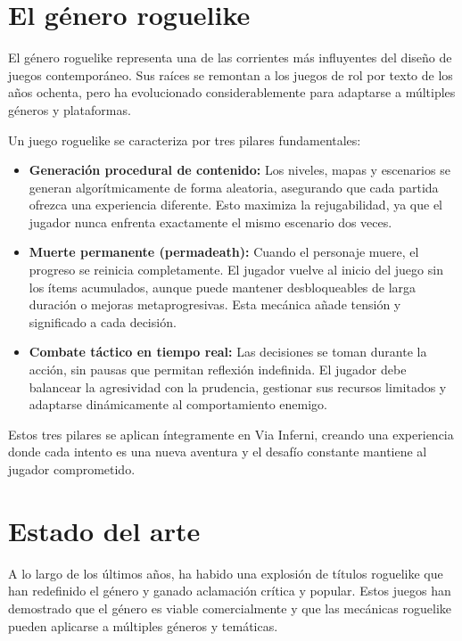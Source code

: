 \section{El género roguelike}

El género roguelike representa una de las corrientes más influyentes
del diseño de juegos contemporáneo.
Sus raíces se remontan a los juegos de rol por texto de los años ochenta,
pero ha evolucionado considerablemente para adaptarse a múltiples géneros y plataformas.

Un juego roguelike se caracteriza por tres pilares fundamentales:

\begin{itemize}
    \item \textbf{Generación procedural de contenido:} Los niveles, mapas y escenarios
se generan algorítmicamente de forma aleatoria,
asegurando que cada partida ofrezca una experiencia diferente.
Esto maximiza la rejugabilidad,
ya que el jugador nunca enfrenta exactamente el mismo escenario dos veces.
    
    \item \textbf{Muerte permanente (permadeath):} Cuando el personaje muere,
el progreso se reinicia completamente.
El jugador vuelve al inicio del juego sin los ítems acumulados,
aunque puede mantener desbloqueables de larga duración o mejoras metaprogresivas.
Esta mecánica añade tensión y significado a cada decisión.
    
    \item \textbf{Combate táctico en tiempo real:} Las decisiones se toman durante la acción,
sin pausas que permitan reflexión indefinida.
El jugador debe balancear la agresividad con la prudencia,
gestionar sus recursos limitados
y adaptarse dinámicamente al comportamiento enemigo.
\end{itemize}

Estos tres pilares se aplican íntegramente en Via Inferni,
creando una experiencia donde cada intento es una nueva aventura
y el desafío constante mantiene al jugador comprometido.

\section{Estado del arte}

A lo largo de los últimos años, ha habido una explosión de títulos roguelike
que han redefinido el género y ganado aclamación crítica y popular.
Estos juegos han demostrado que el género es viable comercialmente
y que las mecánicas roguelike pueden aplicarse a múltiples géneros y temáticas.

